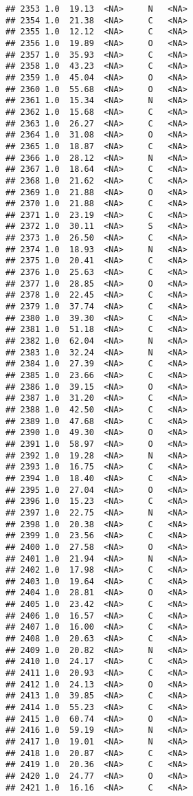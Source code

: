 \documentclass[
]{article}
\begin{document}
\begin{verbatim}
## 2353 1.0  19.13  <NA>     N   <NA>
## 2354 1.0  21.38  <NA>     C   <NA>
## 2355 1.0  12.12  <NA>     C   <NA>
## 2356 1.0  19.89  <NA>     O   <NA>
## 2357 1.0  35.93  <NA>     C   <NA>
## 2358 1.0  43.23  <NA>     C   <NA>
## 2359 1.0  45.04  <NA>     O   <NA>
## 2360 1.0  55.68  <NA>     O   <NA>
## 2361 1.0  15.34  <NA>     N   <NA>
## 2362 1.0  15.68  <NA>     C   <NA>
## 2363 1.0  26.27  <NA>     C   <NA>
## 2364 1.0  31.08  <NA>     O   <NA>
## 2365 1.0  18.87  <NA>     C   <NA>
## 2366 1.0  28.12  <NA>     N   <NA>
## 2367 1.0  18.64  <NA>     C   <NA>
## 2368 1.0  21.62  <NA>     C   <NA>
## 2369 1.0  21.88  <NA>     O   <NA>
## 2370 1.0  21.88  <NA>     C   <NA>
## 2371 1.0  23.19  <NA>     C   <NA>
## 2372 1.0  30.11  <NA>     S   <NA>
## 2373 1.0  26.50  <NA>     C   <NA>
## 2374 1.0  18.93  <NA>     N   <NA>
## 2375 1.0  20.41  <NA>     C   <NA>
## 2376 1.0  25.63  <NA>     C   <NA>
## 2377 1.0  28.85  <NA>     O   <NA>
## 2378 1.0  22.45  <NA>     C   <NA>
## 2379 1.0  37.74  <NA>     C   <NA>
## 2380 1.0  39.30  <NA>     C   <NA>
## 2381 1.0  51.18  <NA>     C   <NA>
## 2382 1.0  62.04  <NA>     N   <NA>
## 2383 1.0  32.24  <NA>     N   <NA>
## 2384 1.0  27.39  <NA>     C   <NA>
## 2385 1.0  23.66  <NA>     C   <NA>
## 2386 1.0  39.15  <NA>     O   <NA>
## 2387 1.0  31.20  <NA>     C   <NA>
## 2388 1.0  42.50  <NA>     C   <NA>
## 2389 1.0  47.68  <NA>     C   <NA>
## 2390 1.0  49.30  <NA>     O   <NA>
## 2391 1.0  58.97  <NA>     O   <NA>
## 2392 1.0  19.28  <NA>     N   <NA>
## 2393 1.0  16.75  <NA>     C   <NA>
## 2394 1.0  18.40  <NA>     C   <NA>
## 2395 1.0  27.04  <NA>     O   <NA>
## 2396 1.0  15.23  <NA>     C   <NA>
## 2397 1.0  22.75  <NA>     N   <NA>
## 2398 1.0  20.38  <NA>     C   <NA>
## 2399 1.0  23.56  <NA>     C   <NA>
## 2400 1.0  27.58  <NA>     O   <NA>
## 2401 1.0  21.94  <NA>     N   <NA>
## 2402 1.0  17.98  <NA>     C   <NA>
## 2403 1.0  19.64  <NA>     C   <NA>
## 2404 1.0  28.81  <NA>     O   <NA>
## 2405 1.0  23.42  <NA>     C   <NA>
## 2406 1.0  16.57  <NA>     C   <NA>
## 2407 1.0  16.00  <NA>     C   <NA>
## 2408 1.0  20.63  <NA>     C   <NA>
## 2409 1.0  20.82  <NA>     N   <NA>
## 2410 1.0  24.17  <NA>     C   <NA>
## 2411 1.0  20.93  <NA>     C   <NA>
## 2412 1.0  24.13  <NA>     O   <NA>
## 2413 1.0  39.85  <NA>     C   <NA>
## 2414 1.0  55.23  <NA>     C   <NA>
## 2415 1.0  60.74  <NA>     O   <NA>
## 2416 1.0  59.19  <NA>     N   <NA>
## 2417 1.0  19.01  <NA>     N   <NA>
## 2418 1.0  20.87  <NA>     C   <NA>
## 2419 1.0  20.36  <NA>     C   <NA>
## 2420 1.0  24.77  <NA>     O   <NA>
## 2421 1.0  16.16  <NA>     C   <NA>

\end{verbatim}
\end{document}
